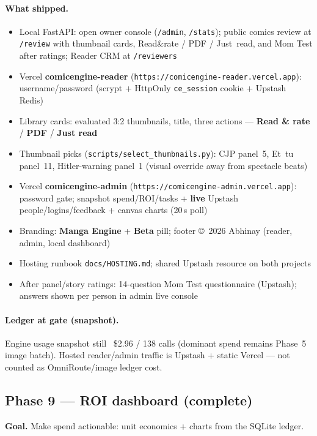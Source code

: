 \documentclass[10pt,twocolumn,letterpaper]{article}
\begin{document}
\paragraph{What shipped.}
\begin{itemize}[leftmargin=*,itemsep=1pt]
  \item Local FastAPI: open owner console (\texttt{/admin}, \texttt{/stats}); public comics review at \texttt{/review} with thumbnail cards, Read\&rate / PDF / Just~read, and Mom Test after ratings; Reader CRM at \texttt{/reviewers}
  \item Vercel \textbf{comicengine-reader} (\texttt{https://comicengine-reader.vercel.app}): username/password (scrypt + HttpOnly \texttt{ce\_session} cookie + Upstash Redis)
  \item Library cards: evaluated 3{:}2 thumbnails, title, three actions --- \textbf{Read \& rate} / \textbf{PDF} / \textbf{Just read}
  \item Thumbnail picks (\texttt{scripts/select\_thumbnails.py}): CJP panel~5, Et~tu panel~11, Hitler-warning panel~1 (visual override away from spectacle beats)
  \item Vercel \textbf{comicengine-admin} (\texttt{https://comicengine-admin.vercel.app}): password gate; snapshot spend/ROI/tasks + \textbf{live} Upstash people/logins/feedback + canvas charts (20\,s poll)
  \item Branding: \textbf{Manga Engine} + \textbf{Beta} pill; footer \copyright~2026 Abhinay (reader, admin, local dashboard)
  \item Hosting runbook \texttt{docs/HOSTING.md}; shared Upstash resource on both projects
  \item After panel/story ratings: 14-question Mom Test questionnaire (Upstash); answers shown per person in admin live console
\end{itemize}

\paragraph{Ledger at gate (snapshot).}
Engine usage snapshot still ~\$2.96 / 138 calls (dominant spend remains Phase~5 image batch). Hosted reader/admin traffic is Upstash + static Vercel --- not counted as OmniRoute/image ledger cost.


\subsection{Phase 9 --- ROI dashboard (complete)}
\textbf{Goal.} Make spend actionable: unit economics + charts from the SQLite ledger.
\end{document}
